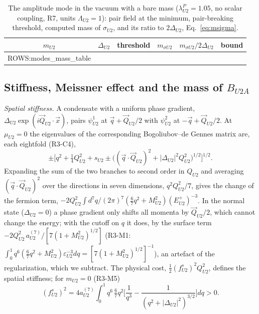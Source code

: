 \begin{table}[t]
\caption{The amplitude mode in the vacuum with a bare mass ($\lambda^P_{U2}=1.05$, no scalar
coupling, R7, units $\Lambda_{U2}=1$): pair field at the minimum, pair-breaking threshold, computed mass
of $\sigma_{U2}$, and its ratio to $2\Delta_{U2}$, Eq.~\eqref{eq:msigma}.}
\label{tab:sigma}
\begin{ruledtabular}
\begin{tabular}{cccccc}
$m_{U2}$ & $\Delta_{U2}$ & threshold & $m_{\sigma U2}$ & $m_{\sigma U2}/2\Delta_{U2}$ & bound\\
\hline
{{ROWS:modes_mass_table}}
\end{tabular}
\end{ruledtabular}
\end{table}

\subsection{Stiffness, Meissner effect and the mass of $B_{U2A}$}
\label{sec:stiffness}

\emph{Spatial stiffness.} A condensate with a uniform phase gradient,
$\Delta_{U2}\exp(i\vec Q_{U2}\cdot\vec x)$, pairs $\psi^1_{U2}$ at $\vec q+\vec Q_{U2}/2$ with
$\psi^2_{U2}$ at $-\vec q+\vec Q_{U2}/2$. At $\mu_{U2}=0$ the eigenvalues of the corresponding
Bogoliubov--de Gennes matrix are, each eightfold (R3-C4),
\begin{equation}
\pm\Big[q^2+\tfrac14Q^2_{U2}+s_{U2}\pm\big((\vec q\cdot\vec Q_{U2})^2+|\Delta_{U2}|^2Q^2_{U2}\big)^{1/2}\Big]^{1/2}.
\label{eq:Qspec}
\end{equation}
Expanding the sum of the two branches to second order in $Q_{U2}$ and averaging
$(\vec q\cdot\vec Q_{U2})^2$ over the directions in seven dimensions, $q^2Q^2_{U2}/7$, gives the change
of the fermion term, $-2Q^2_{U2}\int d^7q/(2\pi)^7(\tfrac67q^2+M^2_{U2})(E^+_{U2})^{-3}$. In the normal
state ($\Delta_{U2}=0$) a phase gradient only shifts all momenta by $\vec Q_{U2}/2$, which cannot change
the energy; with the cutoff on $q$ it does, by the surface term
$-2Q^2_{U2}\,a^{(7)}_{U2}/[7(1+M^2_{U2})^{1/2}]$ (R3-M1: $\int_0^1q^6(\tfrac67q^2+M^2_{U2})\varepsilon^{-3}_{U2}dq
=[7(1+M^2_{U2})^{1/2}]^{-1}$), an artefact of the regularization, which we subtract. The physical
cost, $\tfrac12(f^s_{U2})^2Q^2_{U2}$, defines the spatial stiffness; for $m_{U2}=0$ (R3-M5)
\begin{equation}
(f^s_{U2})^2=4a^{(7)}_{U2}\int_0^1q^6\,\tfrac67q^2\Big[\frac1{q^3}-\frac1{(q^2+|\Delta_{U2}|^2)^{3/2}}\Big]dq>0.
\label{eq:fs}
\end{equation}

